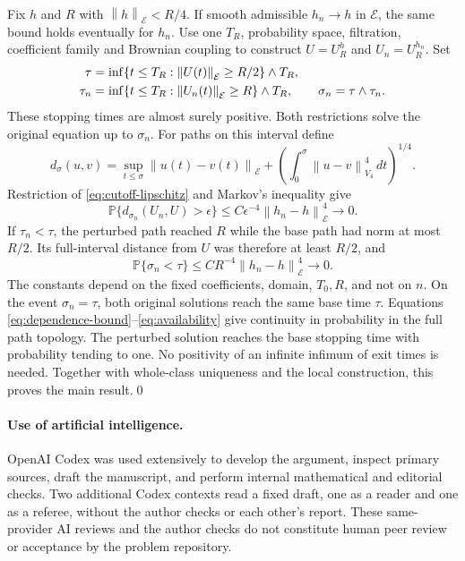 \documentclass[11pt]{article}
\numberwithin{equation}{section}
\theoremstyle{remark}
\newcommand{\PP}{\mathbb P}
\newcommand{\calE}{\mathcal E}
\newcommand{\norm}[1]{\left\lVert#1\right\rVert}
\begin{document}
Fix $h$ and $R$ with $\norm{h}_{\calE}<R/4$. If smooth admissible
$h_n\to h$ in $\calE$, the same bound holds eventually for $h_n$.
Use one $T_R$, probability space, filtration, coefficient family and
Brownian coupling to construct $U=U_R^h$ and $U_n=U_R^{h_n}$. Set
\begin{align}\label{eq:common-stops}
 \tau&=\inf\{t\leq T_R:\norm{U(t)}_{\calE}\geq R/2\}\wedge T_R,\\
 \tau_n&=\inf\{t\leq T_R:\norm{U_n(t)}_{\calE}\geq R\}\wedge T_R,
 \qquad\sigma_n=\tau\wedge\tau_n.\notag
\end{align}
These stopping times are almost surely positive. Both restrictions
solve the original equation up to $\sigma_n$. For paths on this
interval define
\begin{equation}\label{eq:path-distance}
 d_\sigma(u,v)=\sup_{t\leq\sigma}\norm{u(t)-v(t)}_{\calE}
 +\left(\int_0^\sigma\norm{u-v}_{V_4}^4\,dt\right)^{1/4}.
\end{equation}
Restriction of \eqref{eq:cutoff-lipschitz} and Markov's inequality give
\begin{equation}\label{eq:dependence-bound}
 \PP\{d_{\sigma_n}(U_n,U)>\epsilon\}
 \leq C\epsilon^{-4}\norm{h_n-h}_{\calE}^4\longrightarrow0.
\end{equation}
If $\tau_n<\tau$, the perturbed path reached $R$ while the base
path had norm at most $R/2$. Its full-interval distance from $U$
was therefore at least $R/2$, and
\begin{equation}\label{eq:availability}
 \PP\{\sigma_n<\tau\}\leq CR^{-4}\norm{h_n-h}_{\calE}^4
 \longrightarrow0.
\end{equation}
The constants depend on the fixed coefficients, domain, $T_0,R$,
and not on $n$. On the event $\sigma_n=\tau$, both original
solutions reach the same base time $\tau$. Equations
\eqref{eq:dependence-bound}--\eqref{eq:availability} give continuity
in probability in the full path topology. The perturbed solution
reaches the base stopping time with probability tending to one.
No positivity of an infinite
infimum of exit times is needed. Together with whole-class uniqueness
and the local construction, this proves the main result.\qed

\paragraph{Use of artificial intelligence.}
OpenAI Codex was used extensively to develop the argument, inspect primary
sources, draft the manuscript, and perform internal mathematical and
editorial checks. Two additional Codex contexts read a fixed draft,
one as a reader and one as a referee, without the author checks or
each other's report. These same-provider AI reviews and the author
checks do not constitute human peer review or acceptance by the
problem repository.
\end{document}
